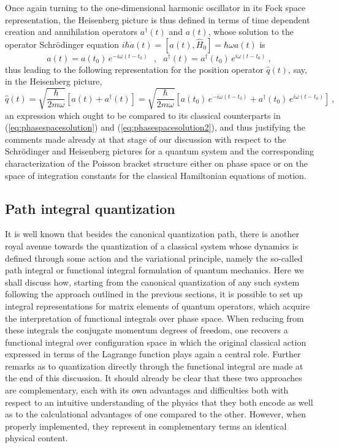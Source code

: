 \documentclass[a4paper,11pt]{article}
\begin{document}
Once again turning to the one-dimensional harmonic oscillator in its Fock 
space representation, the Heisenberg picture is thus defined in terms of
time dependent creation and annihilation operators $a^\dagger (t)$ and
$a(t)$, whose solution to the ope\-rator Schr\"odinger equation 
$i\hbar\dot{a}(t)=[a(t),\hat{H}_0]=\hbar\omega a(t)$ is
\begin{equation}
a(t)=a(t_0)\,e^{-i\omega(t-t_0)}\ \ \ ,\ \ \ 
a^\dagger(t)=a^\dagger(t_0)\,e^{i\omega(t-t_0)}\ ,
\end{equation}
thus leading to the following representation for the position operator
$\hat{q}(t)$, say, in the Heisenberg picture,
\begin{equation}
\hat{q}(t)=\sqrt{\frac{\hbar}{2m\omega}}\left[a(t)+a^\dagger(t)\right]=
\sqrt{\frac{\hbar}{2m\omega}}\left[a(t_0)\,e^{-i\omega(t-t_0)}+
a^\dagger(t_0)\,e^{i\omega(t-t_0)}\right]\ ,
\end{equation}
an expression which ought to be compared to its classical counterparts
in (\ref{eq:phasespacesolution}) and (\ref{eq:phasespacesolution2}),
and thus justifying the comments made already at that stage of our
discussion with respect to the Schr\"odinger and Heisenberg pictures
for a quantum system and the corresponding characterization of the
Poisson bracket structure either on phase space or on the space of
integration constants for the classical Hamiltonian equations of motion.

\subsection{Path integral quantization}

It is well known that besides the canonical quantization path,
there is another royal avenue towards the quantization of a classical
system whose dynamics is defined through some action and the variational
principle, namely the so-called path integral or functional integral 
formulation of quantum mechanics.\cite{Feynman} Here we shall discuss how,
starting from the canonical quantization of any such system following
the approach outlined in the previous sections, it is possible to set up
integral representations for matrix elements of quantum operators, which
acquire the interpretation of functional integrals over phase space.
When reducing from these integrals the conjugate momentum degrees of
freedom, one recovers a functional integral over configuration space
in which the original classical action expressed in terms of the
Lagrange function plays again a central role. Further remarks as to
quantization directly through the functional integral are made
at the end of this discussion. It should already be clear
that these two approaches are complementary, each with its own
advantages and difficulties both with respect to an intuitive 
understanding of the physics that they both encode as well as to the
calculational advantages of one compared to the other. However, when properly 
implemented, they represent in complementary terms an identical
physical content.
\end{document}
